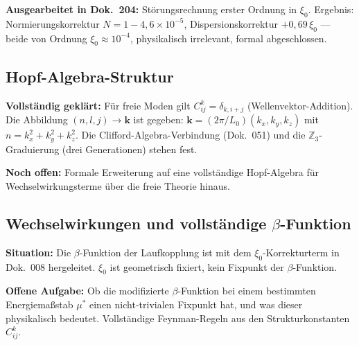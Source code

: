 \textbf{Ausgearbeitet in Dok.~204:} Störungsrechnung erster Ordnung
in $\xi_0$. Ergebnis: Normierungskorrektur $N = 1-4{,}6\times10^{-5}$,
Dispersionskorrektur $+0{,}69\,\xi_0$ — beide von Ordnung
$\xi_0 \approx 10^{-4}$, physikalisch irrelevant, formal abgeschlossen.

\subsection{Hopf-Algebra-Struktur}

\textbf{Vollständig geklärt:} Für freie Moden gilt $C^k_{ij} = \delta_{k,i+j}$
(Wellenvektor-Addition). Die Abbildung $(n,l,j) \to \mathbf{k}$ ist
gegeben: $\mathbf{k} = (2\pi/L_0)(k_x,k_y,k_z)$ mit
$n = k_x^2+k_y^2+k_z^2$. Die Clifford-Algebra-Verbindung
(Dok.~051) und die $\mathbb{Z}_3$-Graduierung (drei Generationen)
stehen fest.

\textbf{Noch offen:} Formale Erweiterung auf eine vollständige
Hopf-Algebra für Wechselwirkungsterme über die freie Theorie hinaus.

\subsection{Wechselwirkungen und vollständige \texorpdfstring{$\beta$}{}-Funktion}

\textbf{Situation:} Die $\beta$-Funktion der Laufkopplung ist
mit dem $\xi_0$-Korrekturterm in Dok.~008 hergeleitet.
$\xi_0$ ist geometrisch fixiert, kein Fixpunkt der $\beta$-Funktion.

\textbf{Offene Aufgabe:} Ob die modifizierte $\beta$-Funktion bei
einem bestimmten Energiemaßstab $\mu^*$ einen nicht-trivialen Fixpunkt
hat, und was dieser physikalisch bedeutet. Vollständige Feynman-Regeln
aus den Strukturkonstanten $C^k_{ij}$.

\begin{center}
{\setlength{\hfuzz}{5pt}\scriptsize
{}}
\end{center}

